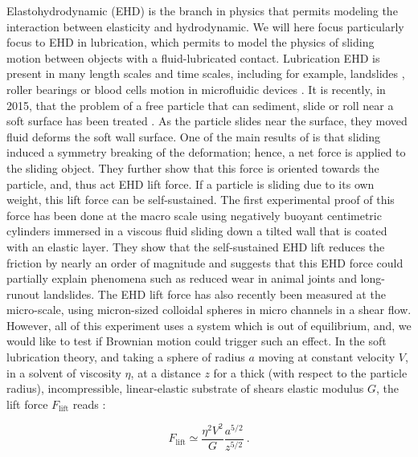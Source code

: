 Elastohydrodynamic (\gls{EHD}) is the branch in physics that permits modeling the interaction between elasticity and hydrodynamic. We will here focus particularly focus to \gls{EHD} in lubrication, which permits to model the physics of sliding motion between objects with a fluid-lubricated contact. Lubrication \gls{EHD} is present in many length scales and time scales, including for example, landslides \cite{campbell_self-lubrication_1989}, roller bearings \cite{hamrock_fundamentals_2004} or blood cells motion in microfluidic devices \cite{byun_characterizing_2013, higgins_sickle_2007, cohen_hydrodynamics_2013}. It is recently, in 2015, that the problem of a free particle that can sediment, slide or roll near a soft surface has been treated  \cite{salez_elastohydrodynamics_2015}. As the particle slides near the surface, they moved fluid deforms the soft wall surface. One of the main results of \cite{salez_elastohydrodynamics_2015} is that sliding induced a symmetry breaking of the deformation; hence, a net force is applied to the sliding object. They further show that this force is oriented towards the particle, and, thus act \gls{EHD} lift force. If a particle is sliding due to its own weight, this lift force can be self-sustained. The first experimental proof of this force has been done at the macro scale using negatively buoyant centimetric cylinders immersed in a viscous fluid sliding down a tilted wall that is coated with an elastic layer. They show that the self-sustained \gls{EHD} lift reduces the friction by nearly an order of magnitude and suggests that this \gls{EHD} force could partially explain phenomena such as reduced wear in animal joints and long-runout landslides. The \gls{EHD} lift force has also recently been measured at the micro-scale, using micron-sized colloidal spheres in micro channels in a shear flow. However, all of this experiment uses a system which is out of equilibrium, and, we would like to test if Brownian motion could trigger such an effect. In the soft lubrication theory, and taking a sphere of radius $a$ moving at constant velocity $V$, in a solvent of viscosity $\eta$, at a distance $z$ for a thick (with respect to the particle radius), incompressible, linear-elastic substrate of shears elastic modulus $G$, the lift force $F_\mathrm{lift}$ reads \cite{skotheim_soft_2004}:

\begin{equation}
	F_\mathrm{lift} \simeq \frac{\eta^2 V^2}{G} \frac{a^{5/2}}{z^{5/2}} ~.
	\label{Eq.lift_deter}
\end{equation}

